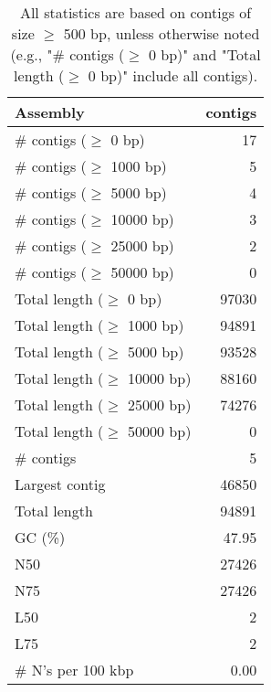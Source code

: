 \documentclass[12pt,a4paper]{article}
\begin{document}
\begin{table}[ht]
\begin{center}
\caption{All statistics are based on contigs of size $\geq$ 500 bp, unless otherwise noted (e.g., "\# contigs ($\geq$ 0 bp)" and "Total length ($\geq$ 0 bp)" include all contigs).}
\begin{tabular}{|l*{1}{|r}|}
\hline
Assembly & contigs \\ \hline
\# contigs ($\geq$ 0 bp) & 17 \\ \hline
\# contigs ($\geq$ 1000 bp) & 5 \\ \hline
\# contigs ($\geq$ 5000 bp) & 4 \\ \hline
\# contigs ($\geq$ 10000 bp) & 3 \\ \hline
\# contigs ($\geq$ 25000 bp) & 2 \\ \hline
\# contigs ($\geq$ 50000 bp) & 0 \\ \hline
Total length ($\geq$ 0 bp) & 97030 \\ \hline
Total length ($\geq$ 1000 bp) & 94891 \\ \hline
Total length ($\geq$ 5000 bp) & 93528 \\ \hline
Total length ($\geq$ 10000 bp) & 88160 \\ \hline
Total length ($\geq$ 25000 bp) & 74276 \\ \hline
Total length ($\geq$ 50000 bp) & 0 \\ \hline
\# contigs & 5 \\ \hline
Largest contig & 46850 \\ \hline
Total length & 94891 \\ \hline
GC (\%) & 47.95 \\ \hline
N50 & 27426 \\ \hline
N75 & 27426 \\ \hline
L50 & 2 \\ \hline
L75 & 2 \\ \hline
\# N's per 100 kbp & 0.00 \\ \hline
\end{tabular}
\end{center}
\end{table}
\end{document}
